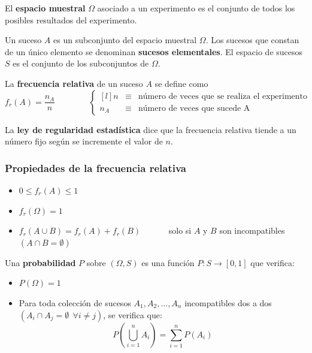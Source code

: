 \documentclass[a4paper]{book}
\begin{document}
\begin{definicion}
	El \textbf{espacio muestral} $ \Omega $ asociado a un experimento es el conjunto de todos los posibles resultados del experimento.

	Un suceso $A$ es un subconjunto del espacio muestral $\Omega$. Los sucesos que constan de un único elemento se denominan \textbf{sucesos elementales}. El espacio de sucesos $S$ es el conjunto de los subconjuntos de $\Omega$.
\end{definicion}

\begin{definicion}
	La \textbf{frecuencia relativa} de un suceso $A$ se define como \[f_r(A) = \frac{n_A}{n} \qquad \qquad \left\lbrace \begin{matrix*}[l] n & \equiv & \text{número de veces que se realiza el experimento}\\
			n_A & \equiv & \text{número de veces que sucede A}
		\end{matrix*} \right. \]

	La \textbf{ley de regularidad estadística} dice que la frecuencia relativa tiende a un número fijo según se incremente el valor de $n$.
\end{definicion}

\subsubsection*{Propiedades de la frecuencia relativa} \vspace*{\parskip}
\begin{itemize}
	\item $0\leq f_r(A)\leq 1$
	\item $f_r(\Omega )=1$
	\item $ f_r\left( A \cup B \right) = f_r(A) + f_r(B)\qquad \quad $ solo si $A$ y $B$ son incompatibles $\left( A \cap B = \emptyset \right)$
\end{itemize}
\newpage

\begin{definicion}
	Una \textbf{probabilidad} $P$ sobre $(\Omega, S)$ es una función $P: S \longrightarrow [0,1]$ que verifica:
\end{definicion}

\begin{itemize}
	\item $P(\Omega )=1$
	\item Para toda colección de sucesos $A_1,A_2,\ldots , A_n$ incompatibles dos a dos\\ $\left( A_i \cap A_j = \emptyset \ \ \forall i \not = j \right)$, se verifica que: \[P\left( \bigcup _{i=1}^n A_i \right) = \sum^{n}_{i=1}{P\left( A_i \right)} \]
\end{itemize}
\end{document}
